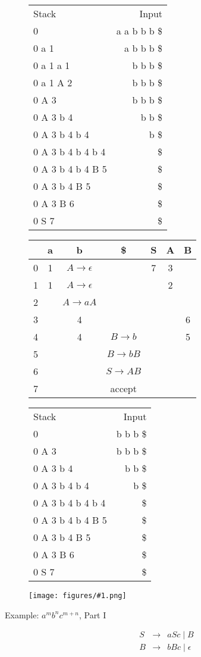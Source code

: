 \documentclass[12pt]{article}
\newcommand{\myfig}[1]{\texttt{[image: figures/\#1.png]}}
\newcommand{\mt}{\ensuremath{\epsilon}}
\begin{document}
\begin{description}
\begin{tabular}{lr}
Stack & Input \\
0 & a a b b b \$\\
0 a 1 & a b b b \$\\
0 a 1 a 1 & b b b \$\\
0 a 1 A 2 & b b b \$\\
0 A 3 & b b b  \$\\
0 A 3 b 4 &  b b \$\\
0 A 3 b 4 b 4 & b \$\\
0 A 3 b 4 b 4 b 4 & \$\\
0 A 3 b 4 b 4 B 5 & \$\\
0 A 3 b 4 B 5 &  \$\\
0 A 3 B 6 &  \$\\
0 S 7 & \$\\
\end{tabular}
\begin{tabular}{|c|c|c|c|c|c|c|}\hline
 & a & b & \$ & S & A & B \\\hline
0 & 1 & $A\rightarrow\mt$&&7&3&\\\hline
1 & 1 & $A\rightarrow\mt$&&&2&\\\hline
2 &&$A\rightarrow aA$&&&&\\\hline
3 &&4&&&&6\\\hline
4 &&4&$B\rightarrow b$&&&5\\\hline
5 &&&$B\rightarrow bB$&&&\\\hline
6 &&&$S\rightarrow AB$&&&\\\hline
7 &&&accept&&&\\\hline
\end{tabular}


\begin{tabular}{lr}
Stack & Input \\
0 & b b b \$\\
0 A 3 & b b b \$\\
0 A 3 b 4 & b b \$\\
0 A 3 b 4 b 4 & b \$\\
0 A 3 b 4 b 4  b 4 & \$\\
0 A 3 b 4 b 4  B 5 & \$\\
0 A 3 b 4 B 5 & \$\\
0 A 3 B 6 & \$\\
0 S 7 & \$\\
\end{tabular}
\myfig{lrparseexamples04}

\newpage
\item[Example: $a^mb^nc^{m+n}$, Part I]
\begin{eqnarray*}
S &\rightarrow& aSc \mid B \\
B &\rightarrow& bBc \mid  \mt
\end{eqnarray*}


\end{description}
\end{document}
